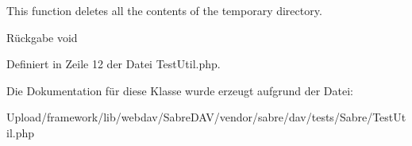 This function deletes all the contents of the temporary directory.

\begin{DoxyReturn}{Rückgabe}
void 
\end{DoxyReturn}


Definiert in Zeile 12 der Datei Test\+Util.\+php.



Die Dokumentation für diese Klasse wurde erzeugt aufgrund der Datei\+:\begin{DoxyCompactItemize}
\item 
Upload/framework/lib/webdav/\+Sabre\+D\+A\+V/vendor/sabre/dav/tests/\+Sabre/Test\+Util.\+php\end{DoxyCompactItemize}

